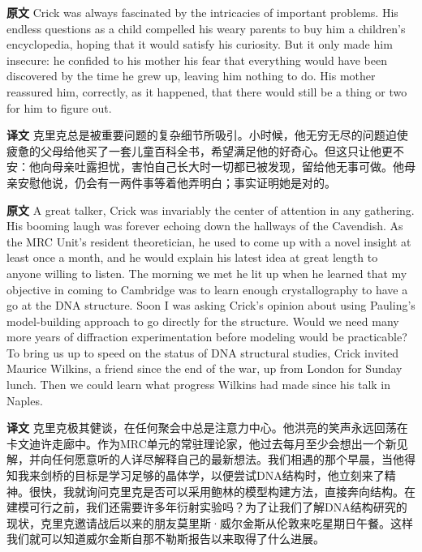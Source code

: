 \documentclass[UTF8,zihao=-4]{ctexart}
\newcommand{\BodyFont}{\fontsize{10.5pt}{15.5pt}\selectfont}
\renewenvironment{quote}{\par\noindent\begingroup\BodyFont}{\par\endgroup}
\begin{document}
\begin{quote}
\noindent\textbf{原文} Crick was always fascinated by the intricacies of important problems. His endless questions as a child compelled his weary parents to buy him a children's encyclopedia, hoping that it would satisfy his curiosity. But it only made him insecure: he confided to his mother his fear that everything would have been discovered by the time he grew up, leaving him nothing to do. His mother reassured him, correctly, as it happened, that there would still be a thing or two for him to figure out.

\smallskip
\noindent\textbf{译文} 克里克总是被重要问题的复杂细节所吸引。小时候，他无穷无尽的问题迫使疲惫的父母给他买了一套儿童百科全书，希望满足他的好奇心。但这只让他更不安：他向母亲吐露担忧，害怕自己长大时一切都已被发现，留给他无事可做。他母亲安慰他说，仍会有一两件事等着他弄明白；事实证明她是对的。
\end{quote}

\begin{quote}
\noindent\textbf{原文} A great talker, Crick was invariably the center of attention in any gathering. His booming laugh was forever echoing down the hallways of the Cavendish. As the MRC Unit's resident theoretician, he used to come up with a novel insight at least once a month, and he would explain his latest idea at great length to anyone willing to listen. The morning we met he lit up when he learned that my objective in coming to Cambridge was to learn enough crystallography to have a go at the DNA structure. Soon I was asking Crick's opinion about using Pauling's model-building approach to go directly for the structure. Would we need many more years of diffraction experimentation before modeling would be practicable? To bring us up to speed on the status of DNA structural studies, Crick invited Maurice Wilkins, a friend since the end of the war, up from London for Sunday lunch. Then we could learn what progress Wilkins had made since his talk in Naples.

\smallskip
\noindent\textbf{译文} 克里克极其健谈，在任何聚会中总是注意力中心。他洪亮的笑声永远回荡在卡文迪许走廊中。作为MRC单元的常驻理论家，他过去每月至少会想出一个新见解，并向任何愿意听的人详尽解释自己的最新想法。我们相遇的那个早晨，当他得知我来剑桥的目标是学习足够的晶体学，以便尝试DNA结构时，他立刻来了精神。很快，我就询问克里克是否可以采用鲍林的模型构建方法，直接奔向结构。在建模可行之前，我们还需要许多年衍射实验吗？为了让我们了解DNA结构研究的现状，克里克邀请战后以来的朋友莫里斯·威尔金斯从伦敦来吃星期日午餐。这样我们就可以知道威尔金斯自那不勒斯报告以来取得了什么进展。
\end{quote}
\end{document}
